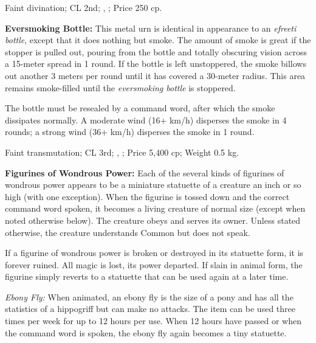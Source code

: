 Faint divination; CL 2nd; , ; Price 250 cp.



\textbf{Eversmoking Bottle:} This metal urn is identical in appearance to an \emph{efreeti bottle}, except that it does nothing but smoke. The amount of smoke is great if the stopper is pulled out, pouring from the bottle and totally obscuring vision across a 15-meter spread in 1 round. If the bottle is left unstoppered, the smoke billows out another 3 meters per round until it has covered a 30-meter radius. This area remains smoke-filled until the \emph{eversmoking bottle} is stoppered.

The bottle must be resealed by a command word, after which the smoke dissipates normally. A moderate wind (16+ km/h) disperses the smoke in 4 rounds; a strong wind (36+ km/h) disperses the smoke in 1 round.

Faint transmutation; CL 3rd; , ; Price 5,400 cp; Weight 0.5 kg.



\textbf{Figurines of Wondrous Power:} Each of the several kinds of figurines of wondrous power appears to be a miniature statuette of a creature an inch or so high (with one exception). When the figurine is tossed down and the correct command word spoken, it becomes a living creature of normal size (except when noted otherwise below). The creature obeys and serves its owner. Unless stated otherwise, the creature understands Common but does not speak.

If a figurine of wondrous power is broken or destroyed in its statuette form, it is forever ruined. All magic is lost, its power departed. If slain in animal form, the figurine simply reverts to a statuette that can be used again at a later time.



\textit{Ebony Fly:} When animated, an ebony fly is the size of a pony and has all the statistics of a hippogriff but can make no attacks. The item can be used three times per week for up to 12 hours per use. When 12 hours have passed or when the command word is spoken, the ebony fly again becomes a tiny statuette.

